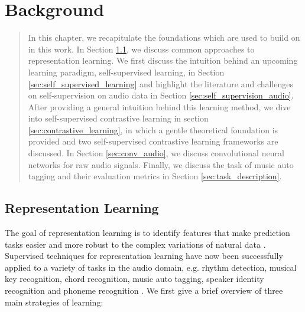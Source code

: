 \chapter{Background}\label{sec:background}
\begin{quote}
    In this chapter, we recapitulate the foundations which are used to build on in this work.
    In Section \ref{sec:representation_learning}, we discuss common approaches to representation learning.
    We first discuss the intuition behind an upcoming learning paradigm, self-supervised learning, in Section \ref{sec:self_supervised_learning} and highlight  the literature and challenges on self-supervision on audio data in Section \ref{sec:self_supervision_audio}. After providing a general intuition behind this learning method, we dive into self-supervised contrastive learning in section \ref{sec:contrastive_learning}, in which a gentle theoretical foundation is provided and two self-supervised contrastive learning frameworks are discussed. In Section \ref{sec:conv_audio}, we discuss convolutional neural networks for raw audio signals.
    Finally, we discuss the task of music auto tagging and their evaluation metrics in Section \ref{sec:task_description}.
\end{quote}


\section{Representation Learning}\label{sec:representation_learning}


The goal of representation learning is to identify features that make  prediction tasks easier and more robust to the complex variations of natural data \cite{bengio2013representation}.
Supervised techniques for representation learning have now been successfully applied to a variety of tasks in the audio domain, e.g. rhythm detection, musical key recognition, chord recognition, music auto tagging, speaker identity recognition and phoneme recognition  \cite{korzeniowski_fully_2016, chen_harmony_2019, korzeniowski_end--end_2017, bock_joint_2016, pons_end--end_2017, van_den_oord_deep_2013}. We first give a brief overview of three main strategies of learning:

